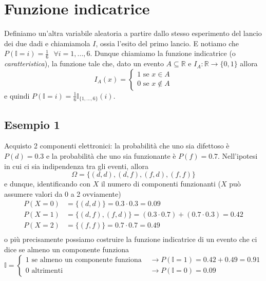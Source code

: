 \documentclass[11pt]{report}
\begin{document}
\section{Funzione indicatrice}
Definiamo un'altra variabile aleatoria a partire dallo stesso esperimento del lancio dei due dadi e chiamiamola $I$, ossia l'esito del primo lancio. E notiamo che $P(\mathbb{I}=i) = \frac{1}{6}\ \ \ \forall i=1,...,6$. Dunque chiamiamo la funzione indicatrice (o \textit{caratteristica}), la funzione tale che, dato un evento $A \subseteq \mathbb{R}$ e $I_A : \mathbb{R} \rightarrow \{0,1\}$ allora
\begin{equation}
    I_A(x) =
    \begin{cases}
    	1 \text{ se } x \in A\\
    	0 \text{ se } x \notin A
    \end{cases}
\end{equation}
e quindi $P(\mathbb{I} = i) = \frac{1}{6} \mathbb{I}_{\{1,...,6\}}(i)$.
\subsection{Esempio 1}
Acquisto 2 componenti elettronici: la probabilità che uno sia difettoso è $P(d) = 0.3$ e la probabilità che uno sia funzionante è $P(f) = 0.7$. Nell'ipotesi in cui ci sia indipendenza tra gli eventi, allora
\begin{equation}
	\Omega = \{(d,d), (d,f), (f,d), (f,f)\}
\end{equation}
e dunque, identificando con $X$ il numero di componenti funzionanti ($X$ può assumere valori da 0 a 2 ovviamente)
\begin{equation}
    \begin{split}
        P(X=0) & = \{(d,d)\} = 0.3 \cdot 0.3 = 0.09\\
        P(X=1) & = \{(d,f), (f,d)\} = (0.3 \cdot 0.7) + (0.7 \cdot 0.3) = 0.42\\
        P(X=2) & = \{(f,f)\} = 0.7 \cdot 0.7 = 0.49\\
    \end{split}
\end{equation}
o più precisamente possiamo costruire la funzione indicatrice di un evento che ci dice se almeno un componente funziona
\begin{equation}
    \mathbb{I} =
    \begin{cases}
    	1 \text{ se almeno un componente funziona } & \rightarrow P(\mathbb{I}=1) = 0.42 + 0.49 = 0.91\\
    	0 \text{ altrimenti } & \rightarrow P(\mathbb{I}=0) = 0.09
    \end{cases}
\end{equation}
\end{document}
